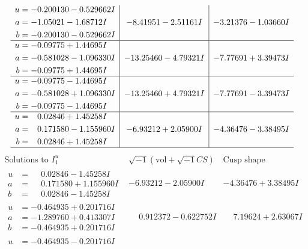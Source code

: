 \documentclass[1p]{elsarticle_modified}
\theoremstyle{definition}
\newcommand{\I}{\sqrt{-1}}
\begin{document}
$$\begin{array}{c|c|c}
\begin{aligned}
u &= -0.200130 - 0.529662 I \\
a &= -1.05021 - 1.68712 I \\
b &= -0.200130 - 0.529662 I\end{aligned}
 & -8.41951 - 2.51161 I & -3.21376 - 1.03660 I \\ \hline\begin{aligned}
u &= -0.09775 + 1.44695 I \\
a &= -0.581028 - 1.096330 I \\
b &= -0.09775 + 1.44695 I\end{aligned}
 & -13.25460 - 4.79321 I & -7.77691 + 3.39473 I \\ \hline\begin{aligned}
u &= -0.09775 - 1.44695 I \\
a &= -0.581028 + 1.096330 I \\
b &= -0.09775 - 1.44695 I\end{aligned}
 & -13.25460 + 4.79321 I & -7.77691 - 3.39473 I \\ \hline\begin{aligned}
u &= \phantom{-}0.02846 + 1.45258 I \\
a &= \phantom{-}0.171580 - 1.155960 I \\
b &= \phantom{-}0.02846 + 1.45258 I\end{aligned}
 & -6.93212 + 2.05900 I & -4.36476 - 3.38495 I\\
 \hline 
 \end{array}$$\newpage$$\begin{array}{c|c|c}  
\text{Solutions to }I^u_{1}& \I (\text{vol} + \sqrt{-1}CS) & \text{Cusp shape}\\
 \hline 
\begin{aligned}
u &= \phantom{-}0.02846 - 1.45258 I \\
a &= \phantom{-}0.171580 + 1.155960 I \\
b &= \phantom{-}0.02846 - 1.45258 I\end{aligned}
 & -6.93212 - 2.05900 I & -4.36476 + 3.38495 I \\ \hline\begin{aligned}
u &= -0.464935 + 0.201716 I \\
a &= -1.289760 + 0.413307 I \\
b &= -0.464935 + 0.201716 I\end{aligned}
 & \phantom{-}0.912372 - 0.622752 I & \phantom{-}7.19624 + 2.63067 I \\ \hline\begin{aligned}
u &= -0.464935 - 0.201716 I \\

\end{aligned}
\end{array}$$
\end{document}
